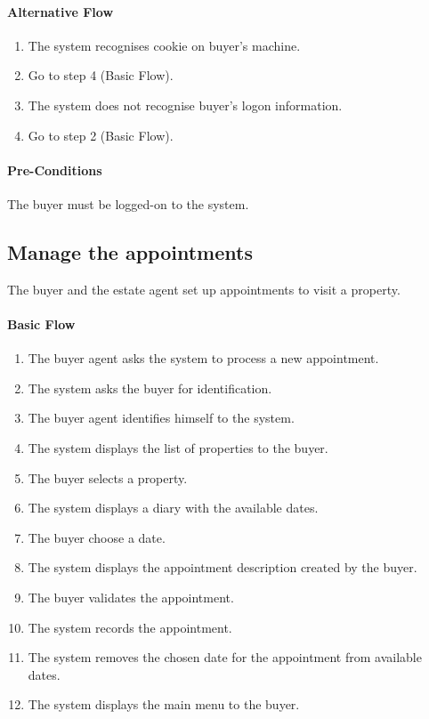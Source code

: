 \documentclass[a4paper,12pt]{article}
\begin{document}
\paragraph{Alternative Flow}
\begin{enumerate}
\item The system recognises cookie on buyer's machine.
\item Go to step 4 (Basic Flow).
\item The system does not recognise buyer's logon information.
\item Go to step 2 (Basic Flow).
\end{enumerate}
\paragraph{Pre-Conditions}
The buyer must be logged-on to the system.

\subsection{Manage the appointments}
The buyer and the estate agent set up appointments to visit a property.

\paragraph{Basic Flow}
\begin{enumerate}
\item The buyer agent asks the system to process a new appointment.
\item The system asks the buyer for identification.
\item The buyer agent identifies himself to the system.
\item The system displays the list of properties to the buyer.
\item The buyer selects a property.
\item The system displays a diary with the available dates.
\item The buyer choose a date.
\item The system displays the appointment description created by the buyer.
\item The buyer validates the appointment.
\item The system records the appointment.
\item The system removes the chosen date for the appointment from available dates.
\item The system displays the main menu to the buyer.
\end{enumerate}
\end{document}
